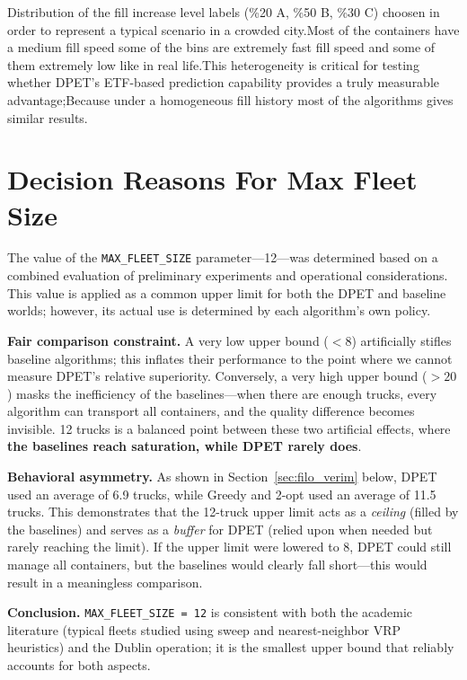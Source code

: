 \documentclass[12pt,a4paper]{report}
\begin{document}
\indent Distribution of the fill increase level labels (\%20 A, \%50 B, \%30 C) choosen in order to represent a typical scenario in a crowded city.Most of the containers have a medium fill speed some of the bins are extremely fast fill speed and some of them extremely low like in real life.This heterogeneity is critical for testing whether DPET’s ETF-based prediction capability provides a truly measurable advantage;Because under a homogeneous fill history most of the algorithms gives similar results.

\section{Decision Reasons For Max Fleet Size}
\label{sec:filo_secimi}

\indent The value of the \texttt{MAX\_FLEET\_SIZE} parameter—12—was determined based on a combined evaluation of preliminary experiments and operational considerations. This value is applied as a common upper limit for both the DPET and baseline worlds; however, its actual use is determined by each algorithm’s own policy.

\indent \textbf{Fair comparison constraint.} A very low upper bound (\(<8\)) artificially stifles baseline algorithms; this inflates their performance to the point where we cannot measure DPET’s relative superiority. Conversely, a very high upper bound (\(>20\)) masks the inefficiency of the baselines—when there are enough trucks, every algorithm can transport all containers, and the quality difference becomes invisible. 12 trucks is a balanced point between these two artificial effects, where \textbf{the baselines reach saturation, while DPET rarely does}.

\indent \textbf{Behavioral asymmetry.} As shown in Section~\ref{sec:filo_verim} below, DPET used an average of 6.9 trucks, while Greedy and 2-opt used an average of 11.5 trucks. This demonstrates that the 12-truck upper limit acts as a \textit{ceiling} (filled by the baselines) and serves as a \textit{buffer} for DPET (relied upon when needed but rarely reaching the limit). If the upper limit were lowered to 8, DPET could still manage all containers, but the baselines would clearly fall short—this would result in a meaningless comparison.

\indent \textbf{Conclusion.} \texttt{MAX\_FLEET\_SIZE = 12} is consistent with both the academic literature (typical fleets studied using sweep and nearest-neighbor VRP heuristics) and the Dublin operation; it is the smallest upper bound that reliably accounts for both aspects.
\end{document}
